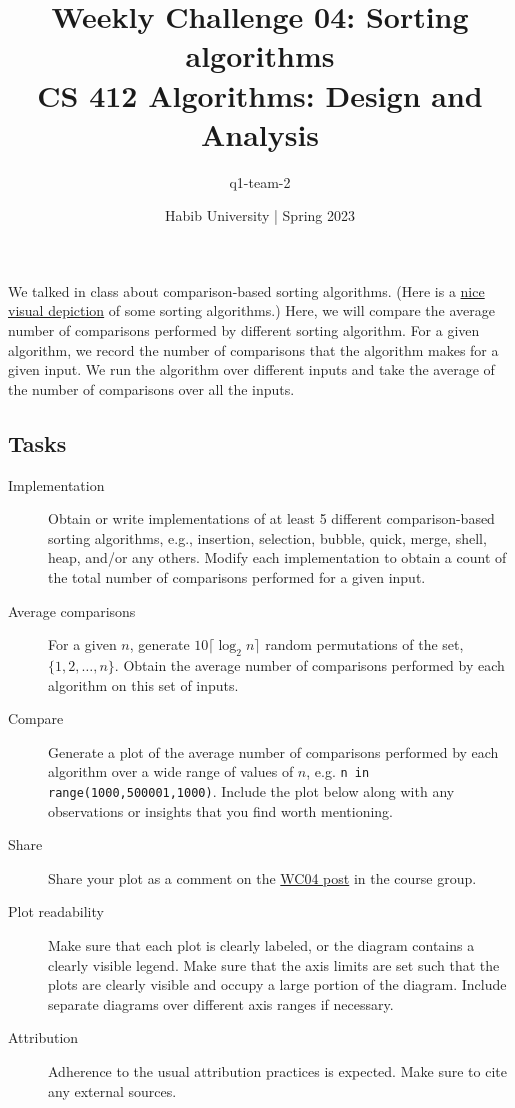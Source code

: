 \documentclass[a4paper]{exam}
\title{Weekly Challenge 04: Sorting algorithms\\CS 412 Algorithms: Design and Analysis}
\author{q1-team-2}  %
\date{Habib University | Spring 2023}
\begin{document}
\maketitle

\begin{questions}



	We talked in class about comparison-based sorting algorithms. (Here is a \href{https://www.youtube.com/watch?v=kPRA0W1kECg&t=344s}{nice visual depiction} of some sorting algorithms.) Here, we will compare the average number of comparisons performed by different sorting algorithm.
	For a given algorithm, we record the number of comparisons that the algorithm makes for a given input. We run the algorithm over different inputs and take the average of the number of comparisons over all the inputs.

	\subsection*{Tasks}
	\begin{description}
		\item[Implementation] Obtain or write implementations of at least 5 different comparison-based sorting algorithms, e.g., insertion, selection, bubble, quick, merge, shell, heap, and/or any others. Modify each implementation to obtain a count of the total number of comparisons performed for a given input.
		\item[Average comparisons] For a given $n$, generate $10\lceil \log_2 n \rceil$ random permutations of the set, $\{1,2,\ldots,n\}$. Obtain the average number of comparisons performed by each algorithm on this set of inputs.
		\item[Compare] Generate a plot of the average number of comparisons performed by each algorithm over a wide range of values of $n$, e.g. \texttt{n in range(1000,500001,1000)}. Include the plot below along with any observations or insights that you find worth mentioning.
		\item[Share] Share your plot as a comment on the \href{https://web.yammer.com/main/org/habib.edu.pk/threads/eyJfdHlwZSI6IlRocmVhZCIsImlkIjoiMjExNDMxMzQ1MDUwNDE5MiJ9}{WC04 post} in the course group.
		\item[Plot readability] Make sure that each plot is clearly labeled, or the diagram contains a clearly visible legend. Make sure that the axis limits are set such that the plots are clearly visible and occupy a large portion of the diagram. Include separate diagrams over different axis ranges if necessary.
		\item[Attribution] Adherence to the usual attribution practices is expected. Make sure to cite any external sources.
	\end{description}


\end{questions}
\end{document}
